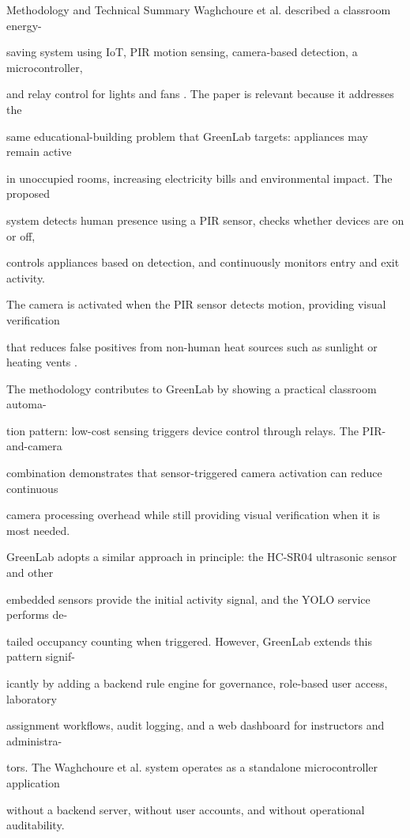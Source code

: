 Methodology and Technical Summary Waghchoure et al. described a classroom energy-

saving system using IoT, PIR motion sensing, camera-based detection, a microcontroller,

and relay control for lights and fans \cite{waghchoure2025}. The paper is relevant because it addresses the

same educational-building problem that GreenLab targets: appliances may remain active

in unoccupied rooms, increasing electricity bills and environmental impact. The proposed

system detects human presence using a PIR sensor, checks whether devices are on or off,

controls appliances based on detection, and continuously monitors entry and exit activity.

The camera is activated when the PIR sensor detects motion, providing visual veriﬁcation

that reduces false positives from non-human heat sources such as sunlight or heating vents \cite{waghchoure2025}.

The methodology contributes to GreenLab by showing a practical classroom automa-

tion pattern: low-cost sensing triggers device control through relays. The PIR-and-camera

combination demonstrates that sensor-triggered camera activation can reduce continuous

camera processing overhead while still providing visual veriﬁcation when it is most needed.

GreenLab adopts a similar approach in principle: the HC-SR04 ultrasonic sensor and other

embedded sensors provide the initial activity signal, and the YOLO service performs de-

tailed occupancy counting when triggered. However, GreenLab extends this pattern signif-

icantly by adding a backend rule engine for governance, role-based user access, laboratory

assignment workﬂows, audit logging, and a web dashboard for instructors and administra-

tors. The Waghchoure et al. system operates as a standalone microcontroller application

without a backend server, without user accounts, and without operational auditability.

